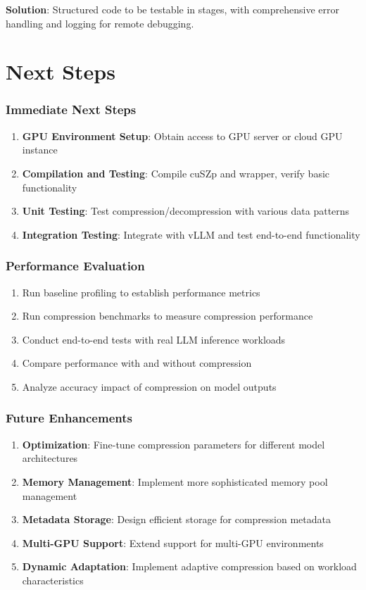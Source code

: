 \documentclass{polyu-comp}
\begin{document}
\textbf{Solution}: Structured code to be testable in stages, with comprehensive error handling and logging for remote debugging.


\chapter{Next Steps}

\subsection{Immediate Next Steps}

\begin{enumerate}
    \item \textbf{GPU Environment Setup}: Obtain access to GPU server or cloud GPU instance
    \item \textbf{Compilation and Testing}: Compile cuSZp and wrapper, verify basic functionality
    \item \textbf{Unit Testing}: Test compression/decompression with various data patterns
    \item \textbf{Integration Testing}: Integrate with vLLM and test end-to-end functionality
\end{enumerate}

\subsection{Performance Evaluation}

\begin{enumerate}
    \item Run baseline profiling to establish performance metrics
    \item Run compression benchmarks to measure compression performance
    \item Conduct end-to-end tests with real LLM inference workloads
    \item Compare performance with and without compression
    \item Analyze accuracy impact of compression on model outputs
\end{enumerate}

\subsection{Future Enhancements}

\begin{enumerate}
    \item \textbf{Optimization}: Fine-tune compression parameters for different model architectures
    \item \textbf{Memory Management}: Implement more sophisticated memory pool management
    \item \textbf{Metadata Storage}: Design efficient storage for compression metadata
    \item \textbf{Multi-GPU Support}: Extend support for multi-GPU environments
    \item \textbf{Dynamic Adaptation}: Implement adaptive compression based on workload characteristics
\end{enumerate}
\end{document}
